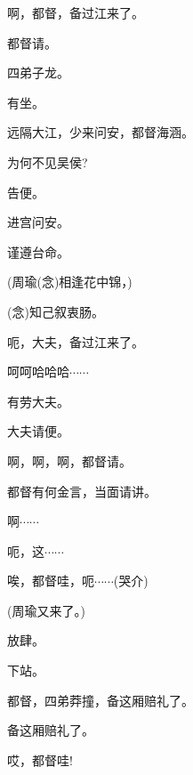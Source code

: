 {

\vspace{5pt}

啊，都督，备过江来了。

都督请。

四弟子龙。

\vspace{5pt}

有坐。

远隔大江，少来问安，都督海涵。

为何不见吴侯?

告便。

进宫问安。

谨遵台命。

(周瑜\hspace{30pt}({\akai 念})相逢花中锦，)

({\akai 念})知己叙衷肠。

\vspace{5pt}

呃，大夫，备过江来了。

呵呵哈哈哈$\cdots{}\cdots{}$

有劳大夫。

大夫请便。

啊，啊，啊，都督请。

都督有何金言，当面请讲。

啊$\cdots{}\cdots{}$

呃，这$\cdots{}\cdots{}$

唉，都督哇，呃$\cdots{}\cdots{}$({\hwfs 哭介})

(周瑜\hspace{30pt}又来了。)


放肆。

下站。


都督，四弟莽撞，备这厢赔礼了。

备这厢赔礼了。

哎，都督哇!

}
